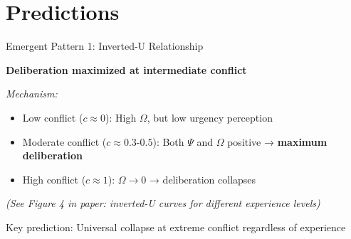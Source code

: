 \documentclass[aspectratio=169]{beamer}
\begin{document}
\section{Predictions}

\begin{frame}{Emergent Pattern 1: Inverted-U Relationship}

\textbf{Deliberation maximized at intermediate conflict}

\vspace{0.5em}

\textit{Mechanism:}
\begin{itemize}
    \item Low conflict ($c \approx 0$): High $\Omega$, but low urgency perception
    \item \alert{Moderate conflict ($c \approx 0.3$-$0.5$)}: Both $\Psi$ and $\Omega$ positive → \textbf{maximum deliberation}
    \item High conflict ($c \approx 1$): $\Omega \to 0$ → deliberation collapses
\end{itemize}

\vspace{0.5em}

\begin{center}
\textit{(See Figure 4 in paper: inverted-U curves for different experience levels)}
\end{center}

\vspace{0.5em}

\alert{Key prediction:} Universal collapse at extreme conflict regardless of experience

\end{frame}
\end{document}
